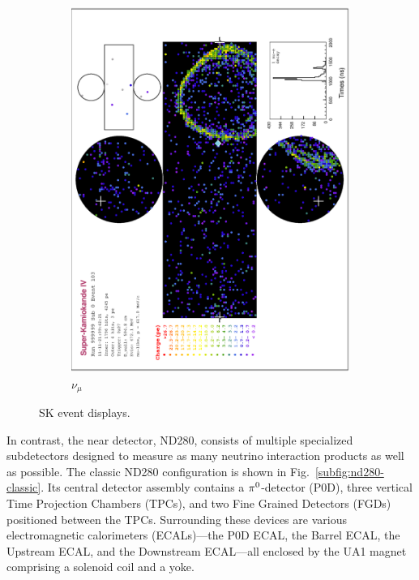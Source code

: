 \begin{figure}
\begin{subfigure}[b]{\dbfigwid\textwidth}
        \includegraphics[width=\textwidth]{figures/t2k/sk-numu.eps}
        \caption{\(\nu_\mu\)}
        \label{subfig:sk-numu}
    \end{subfigure}
    \caption{SK event displays.}
    \label{fig:sk-e-mu}
\end{figure}

In contrast, the near detector, ND280, consists of multiple specialized subdetectors designed to measure as many neutrino interaction products as well as possible.  
The classic ND280 configuration is shown in Fig.~\ref{subfig:nd280-classic}.  
Its central detector assembly contains a \(\pi^0\)-detector (P0D), three vertical Time Projection Chambers (TPCs), and two Fine Grained Detectors (FGDs) positioned between the TPCs.  
Surrounding these devices are various electromagnetic calorimeters (ECALs)—the P0D ECAL, the Barrel ECAL, the Upstream ECAL, and the Downstream ECAL—all enclosed by the UA1 magnet comprising a solenoid coil and a yoke.

